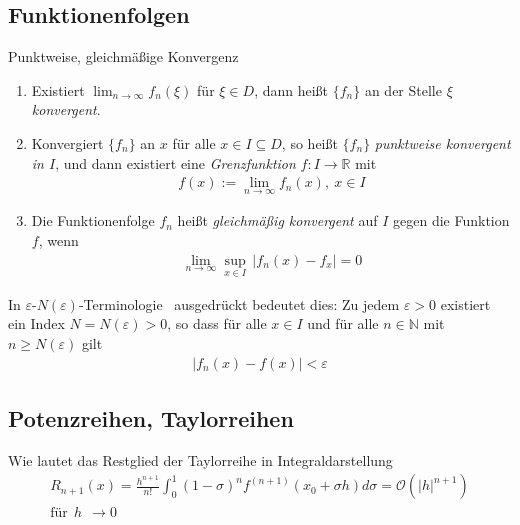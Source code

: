 \subsection{Funktionenfolgen}
\begin{karte}{Punktweise, gleichmäßige Konvergenz}
	{\normalsize
		\begin{enumerate}[label=\(\triangleright \)]
			\item Existiert \(\displaystyle\lim_{n\to\infty}f_{n}(\xi)\) für \(\xi\in D \), dann heißt \( \{ f_n \} \) an der Stelle \( \xi \) \emph{konvergent}.
			\item Konvergiert \( \{ f_n \} \) an \(x\) für alle \(x\in I \subseteq D\), so heißt \( \{ f_n \} \) \emph{punktweise konvergent in \(I\)}, und dann existiert eine \emph{Grenzfunktion} \(f:I\to\mathbb{R}\) mit
			      \begin{align}
			      	f(x):=\lim_{n\to\infty}f_{n}(x),\ x\in I
			      \end{align}
			\item Die Funktionenfolge \(f_{n}\) heißt \emph{gleichmäßig konvergent} auf \( I \) gegen die Funktion \( f \), wenn
			      \begin{align}
			      	\lim_{n\to\infty} \sup_{x\in I}\, \lvert f_{n}(x)-f_{x}\rvert = 0
			      \end{align}
		\end{enumerate}
		In \glqq\(\varepsilon\)-\(N(\varepsilon)\)-Terminologie \grqq\ ausgedrückt bedeutet dies:
		Zu jedem \(\varepsilon > 0\) existiert ein Index \(N=N(\varepsilon)>0\), so dass für alle \(x\in I\) und für alle \(n\in\mathbb{N}\) mit \(n\geq N(\varepsilon)\) gilt
		\begin{align}
			\lvert f_{n}(x)-f(x)\rvert < \varepsilon
		\end{align}
	}
\end{karte}

\subsection{Potenzreihen, Taylorreihen}
\begin{karte}{Wie lautet das Restglied der Taylorreihe in Integraldarstellung}
	\begin{multline}
		R_{n+1}(x)=\frac{h^{n+1}}{n!}\int_{0}^1{(1-\sigma)}^{n}f^{(n+1)}(x_{0}+\sigma h)d\sigma=\mathcal{O}({\lvert h\rvert}^{n+1})\\ \text{für}\ \ h\ \ \to 0
	\end{multline}
\end{karte}

